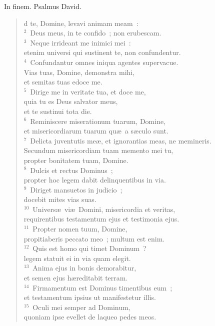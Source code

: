 \bchapter[Psalm]
In finem. Psalmus David. \begin{verse}d te, Domine, levavi animam meam~:\\
${}^{2}$~Deus meus, in te confido~; non erubescam.\\
${}^{3}$~Neque irrideant me inimici mei~:\\ etenim universi qui sustinent te, non confundentur.\\
${}^{4}$~Confundantur omnes iniqua agentes supervacue.\\ Vias tuas, Domine, demonstra mihi,\\ et semitas tuas edoce me.\\
${}^{5}$~Dirige me in veritate tua, et doce me,\\ quia tu es Deus salvator meus,\\ et te sustinui tota die.\\
${}^{6}$~Reminiscere miserationum tuarum, Domine,\\ et misericordiarum tuarum qu\ae\ a s\ae culo sunt.\\
${}^{7}$~Delicta juventutis me\ae , et ignorantias meas, ne memineris.\\ Secundum misericordiam tuam memento mei tu,\\ propter bonitatem tuam, Domine.\\
${}^{8}$~Dulcis et rectus Dominus~;\\ propter hoc legem dabit delinquentibus in via.\\
${}^{9}$~Diriget mansuetos in judicio~;\\ docebit mites vias suas.\\
${}^{10}$~Univers\ae\ vi\ae\ Domini, misericordia et veritas,\\ requirentibus testamentum ejus et testimonia ejus.\\
${}^{11}$~Propter nomen tuum, Domine,\\ propitiaberis peccato meo~; multum est enim.\\
${}^{12}$~Quis est homo qui timet Dominum~?\\ legem statuit ei in via quam elegit.\\
${}^{13}$~Anima ejus in bonis demorabitur,\\ et semen ejus h\ae reditabit terram.\\
${}^{14}$~Firmamentum est Dominus timentibus eum~;\\ et testamentum ipsius ut manifestetur illis.\\
${}^{15}$~Oculi mei semper ad Dominum,\\ quoniam ipse evellet de laqueo pedes meos.\\

\end{verse}
